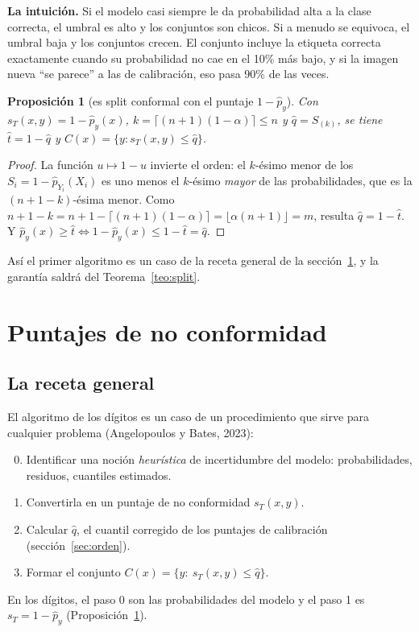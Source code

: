 \documentclass[11pt]{article}
\theoremstyle{plain}
\newtheorem{proposicion}[teorema]{Proposición}
\theoremstyle{definition}
\theoremstyle{remark}
\newcommand{\qhat}{\widehat q}
\newcommand{\phat}{\widehat p}
\newcommand{\dest}[1]{\par\needspace{4\baselineskip}\textbf{#1}\quad}
\newcommand{\lamina}[1]{}%
\begin{document}
\dest{La intuición.} Si el modelo casi siempre le da probabilidad alta a la clase correcta, el umbral
es alto y los conjuntos son chicos. Si a menudo se equivoca, el umbral baja y los conjuntos crecen.
El conjunto incluye la etiqueta correcta exactamente cuando su probabilidad no cae en el 10\% más bajo,
y si la imagen nueva ``se parece'' a las de calibración, eso pasa 90\% de las veces.

\begin{proposicion}[es split conformal con el puntaje $1-\phat_y$]\label{prop:primer}
Con $s_T(x,y)=1-\phat_y(x)$, $k=\lceil(n+1)(1-\alpha)\rceil\le n$ y $\qhat=S_{(k)}$, se tiene
$\widehat t=1-\qhat$ y $C(x)=\{y: s_T(x,y)\le\qhat\}$.
\end{proposicion}
\begin{proof}
La función $u\mapsto1-u$ invierte el orden: el $k$-ésimo menor de los $S_i=1-\phat_{Y_i}(X_i)$ es uno
menos el $k$-ésimo \emph{mayor} de las probabilidades, que es la $(n+1-k)$-ésima menor. Como
$n+1-k=n+1-\lceil(n+1)(1-\alpha)\rceil=\lfloor\alpha(n+1)\rfloor=m$, resulta $\qhat=1-\widehat t$. Y
$\phat_y(x)\ge\widehat t\iff1-\phat_y(x)\le1-\widehat t=\qhat$.
\end{proof}
Así el primer algoritmo es un caso de la receta general de la sección~\ref{sec:puntajes}, y la garantía
saldrá del Teorema~\ref{teo:split}.

\section{Puntajes de no conformidad}\label{sec:puntajes}\lamina{10--11}
\subsection{La receta general}
El algoritmo de los dígitos es un caso de un procedimiento que sirve para cualquier problema
(Angelopoulos y Bates, 2023):
\begin{enumerate}\setcounter{enumi}{-1}
\item Identificar una noción \emph{heurística} de incertidumbre del modelo: probabilidades, residuos,
cuantiles estimados.
\item Convertirla en un puntaje de no conformidad $s_T(x,y)$.
\item Calcular $\qhat$, el cuantil corregido de los puntajes de calibración (sección~\ref{sec:orden}).
\item Formar el conjunto $C(x)=\{y:\ s_T(x,y)\le\qhat\}$.
\end{enumerate}
En los dígitos, el paso 0 son las probabilidades del modelo y el paso 1 es $s_T=1-\phat_y$
(Proposición~\ref{prop:primer}).
\end{document}
